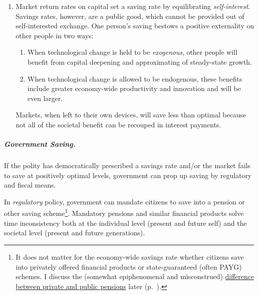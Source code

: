 \begin{enumerate}
	\item Market return rates on capital set a saving rate by equilibrating \emph{self-interest}. Savings rates, however, are a public good, which cannot be provided out of self-interested exchange. One person's saving  bestows a positive externality on other people in two ways:

	\begin{enumerate}
		\item When technological change is held to be \emph{exogenous}, other people will benefit from capital deepening and approximating of steady-state growth.
		\item When technological change is allowed to be endogenous, these benefits include greater economy-wide productivity and innovation and will be even larger.
	\end{enumerate}

	Markets, when left to their own devices, will save less than optimal because not all of the societal benefit can be recouped in interest payments. %
\end{enumerate}

\subparagraph{Government Saving.}  \label{sec:government-saves} If the polity has democratically prescribed a savings rate and/or the market fails to save at positively optimal levels, government can prop up saving by regulatory and fiscal means.

In \emph{regulatory} policy, government can mandate citizens to save into a pension or other saving scheme\footnote{
	It does not matter for the economy-wide savings rate whether citizens save into privately offered financial products or state-guaranteed (often \gls{PAYG}) schemes. I discuss the (somewhat epiphenomenal and misconstrued) \hyperref[sec:pensions]{difference between private and public pensions} later (p.~\pageref{sec:pensions}).}.
Mandatory pensions and similar financial products solve time inconsistency both at the individual level (present and future self) and the societal level (present and future generations).

